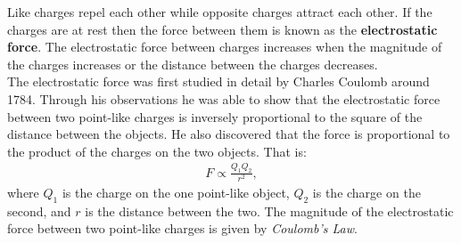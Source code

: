 Like charges repel each other while opposite charges attract each other. If the charges are at rest then the force between
them is known as the \textbf{electrostatic force}. The
electrostatic force between charges increases when the magnitude
of the charges increases or the distance between the charges
decreases.\\
 
The electrostatic force was first studied in detail by
Charles Coulomb around 1784. Through his observations he was able
to show that the electrostatic force between two point-like
charges is inversely proportional to the square of the distance
between the objects. He also discovered that the force is
proportional to the product of the charges on the two objects. That is:\\
 
\begin{eqnarray*}
F \propto \frac{Q_1 Q_2}{r^2},
\end{eqnarray*}
where $Q_1$ is the charge on the one point-like object, $Q_2$ is
the charge on the second, and $r$ is the distance between the two.
The magnitude of the electrostatic force between two point-like
charges is given by \textit{Coulomb's Law}.\\
 


